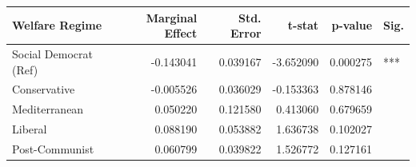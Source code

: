 \begin{tabular}{lrrrrl}
\toprule
Welfare Regime & Marginal Effect & Std. Error & t-stat & p-value & Sig. \\
\midrule
Social Democrat (Ref) & -0.143041 & 0.039167 & -3.652090 & 0.000275 & *** \\
Conservative & -0.005526 & 0.036029 & -0.153363 & 0.878146 &  \\
Mediterranean & 0.050220 & 0.121580 & 0.413060 & 0.679659 &  \\
Liberal & 0.088190 & 0.053882 & 1.636738 & 0.102027 &  \\
Post-Communist & 0.060799 & 0.039822 & 1.526772 & 0.127161 &  \\
\bottomrule
\end{tabular}
